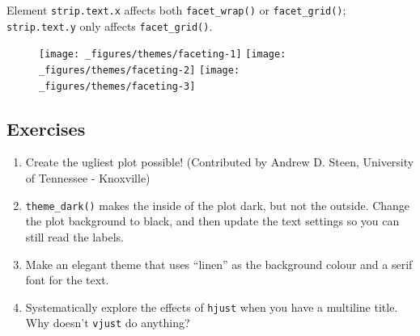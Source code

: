 Element \texttt{strip.text.x} affects both \texttt{facet\_wrap()} or
\texttt{facet\_grid()}; \texttt{strip.text.y} only affects
\texttt{facet\_grid()}.

\begin{Shaded}
\begin{Highlighting}[]
\StringTok{ }\NormalTok{(} \NormalTok{:}\NormalTok{, } \NormalTok{:}\NormalTok{, } \NormalTok{(}\NormalTok{, }\NormalTok{, }\NormalTok{, }\NormalTok{))}
\StringTok{ }\StringTok{ }\NormalTok{() +}\StringTok{ }

\StringTok{ }\NormalTok{(} \NormalTok{(}\NormalTok{, }\NormalTok{))}
\StringTok{ }\NormalTok{(}
   \NormalTok{(} \NormalTok{, } \NormalTok{, } \NormalTok{),}
   \NormalTok{(} \NormalTok{)}
\NormalTok{)}
\end{Highlighting}
\end{Shaded}

\begin{figure}[H]
  \texttt{[image: \_figures/themes/faceting-1]}%
  \texttt{[image: \_figures/themes/faceting-2]}%
  \texttt{[image: \_figures/themes/faceting-3]}
\end{figure}

\subsection{Exercises}

\begin{enumerate}
\def\labelenumi{\arabic{enumi}.}
\item
  Create the ugliest plot possible! (Contributed by Andrew D. Steen,
  University of Tennessee - Knoxville)
\item
  \texttt{theme\_dark()} makes the inside of the plot dark, but not the
  outside. Change the plot background to black, and then update the text
  settings so you can still read the labels.
\item
  Make an elegant theme that uses ``linen'' as the background colour and
  a serif font for the text.
\item
  Systematically explore the effects of \texttt{hjust} when you have a
  multiline title. Why doesn't \texttt{vjust} do anything?
\end{enumerate}

